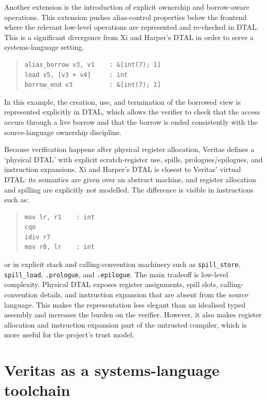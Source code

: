Another extension is the introduction of explicit ownership and borrow-aware operations.
This extension pushes alias-control properties below the frontend where the relevant low-level operations are represented and re-checked in DTAL. This is a significant divergence from Xi and Harper's DTAL in order to serve a systems-language setting.

\begin{quote}
  \begin{verbatim}
alias_borrow v3, v1    : &[int(7); 1]
load v5, [v3 + v4]     : int
borrow_end v3          : &[int(7); 1]
  \end{verbatim}
\end{quote}

In this example, the creation, use, and termination of the borrowed view is represented explicitly in DTAL, which allows the verifier to check that the access occurs through a live borrow and that the borrow is ended consistently with the source-language ownership discipline.

Because verification happens after physical register allocation, Veritas defines a `physical DTAL' with explicit scratch-register use, spills, prologues/epilogues, and instruction expansions. Xi and Harper's DTAL is closest to Veritas' virtual DTAL: its semantics are given over an abstract machine, and register allocation and spilling are explicitly not modelled. The difference is visible in instructions such as:

\begin{quote}
  \begin{verbatim}
mov lr, r1    : int
cqo
idiv r7
mov r0, lr    : int
\end{verbatim}
\end{quote}

or in explicit stack and calling-convention machinery such as
\texttt{spill\_store}, \texttt{spill\_load}, \texttt{.prologue}, and
\texttt{.epilogue}.
The main tradeoff is low-level complexity. Physical DTAL exposes register assignments, spill slots, calling-convention details, and instruction expansion that are absent from the source language. This makes the representation less elegant than an idealised typed assembly and increases the burden on the verifier. However, it also makes register allocation and instruction expansion part of the untrusted compiler, which is more useful for the project's trust model.




\section{Veritas as a systems-language toolchain}\label{sec:veritas-sys-eval}

